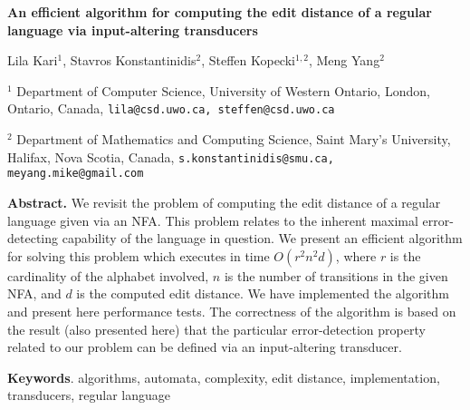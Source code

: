 \documentclass{article}
\theoremstyle{plain}
\theoremstyle{definition}
\theoremstyle{remark}
\newcommand\pssn{\par\smallskip\noindent}
\newcommand\pmsn{\par\medskip\noindent}
\newcommand\pbsn{\par\bigskip\noindent}
\begin{document}
\begin{center}
\textbf{\Large An efficient algorithm for computing the edit distance of a regular language via input-altering transducers}
\end{center}


{\large Lila Kari$^{1}$, Stavros Konstantinidis$^{2}$,
Steffen Kopecki$^{1,2}$, Meng Yang$^{2}$}
\pmsn
$^{1}$ Department of Computer Science, University of Western Ontario, London, Ontario, Canada,
\texttt{lila@csd.uwo.ca, steffen@csd.uwo.ca}
\pssn
$^{2}$ Department of Mathematics and Computing Science,
Saint Mary's University, Halifax, Nova Scotia, Canada,
\texttt{s.konstantinidis@smu.ca, meyang.mike@gmail.com}

\pbsn
\textbf{Abstract.}
We revisit the problem of computing the edit distance
of a regular language given via an NFA. This problem
relates to the inherent maximal error-detecting capability of the language in question. We present an efficient algorithm
for solving this problem which executes in time $O(r^2n^2d)$, where $r$ is the cardinality of
the alphabet involved, $n$ is
the number of transitions in the given NFA, and $d$ is the
computed edit distance. We have implemented the algorithm
and present here performance tests. The correctness of the
algorithm is based on the result (also presented here) that
the particular error-detection property related to our problem can be defined via an input-altering transducer.

\pbsn
\textbf{Keywords}.
algorithms, automata, complexity, edit distance, implementation, transducers, regular language
\end{document}
